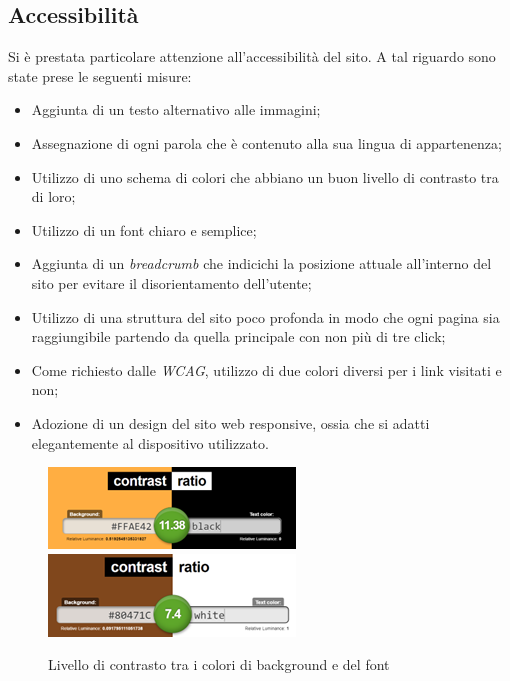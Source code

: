 \subsection{Accessibilità}
Si è prestata particolare attenzione all'accessibilità del sito. A tal riguardo sono state prese le
seguenti misure:
\begin{itemize}
	\item Aggiunta di un testo alternativo alle immagini;
	\item Assegnazione di ogni parola che è contenuto alla sua lingua di appartenenza;
	\item Utilizzo di uno schema di colori che abbiano un buon livello di contrasto tra di loro;
	\item Utilizzo di un font chiaro e semplice;
	\item Aggiunta di un \textit{breadcrumb} che indicichi la posizione attuale all'interno del sito per
	evitare il disorientamento dell'utente;
	\item Utilizzo di una struttura del sito poco profonda in modo che ogni pagina sia raggiungibile
	partendo da quella principale con non più di tre click;
	\item Come richiesto dalle \textit{WCAG}, utilizzo di due colori diversi per i link visitati e non;
	\item Adozione di un design del sito web responsive, ossia che si adatti elegantemente
	al dispositivo utilizzato.
\end{itemize}
\begin{figure}[H]
	\centering
	\includegraphics[scale=1]{resources/contrast_1.png}
	\includegraphics[scale=1]{resources/contrast_2.png}
	\caption{Livello di contrasto tra i colori di background e del font}
\end{figure}